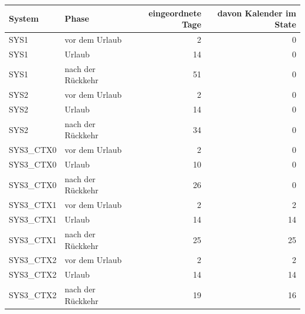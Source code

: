 \begin{tabular}{llrr}
\toprule
System & Phase & eingeordnete Tage & davon Kalender im State \\
\midrule
SYS1 & vor dem Urlaub & 2 & 0 \\
SYS1 & Urlaub & 14 & 0 \\
SYS1 & nach der Rückkehr & 51 & 0 \\
SYS2 & vor dem Urlaub & 2 & 0 \\
SYS2 & Urlaub & 14 & 0 \\
SYS2 & nach der Rückkehr & 34 & 0 \\
SYS3\_CTX0 & vor dem Urlaub & 2 & 0 \\
SYS3\_CTX0 & Urlaub & 10 & 0 \\
SYS3\_CTX0 & nach der Rückkehr & 26 & 0 \\
SYS3\_CTX1 & vor dem Urlaub & 2 & 2 \\
SYS3\_CTX1 & Urlaub & 14 & 14 \\
SYS3\_CTX1 & nach der Rückkehr & 25 & 25 \\
SYS3\_CTX2 & vor dem Urlaub & 2 & 2 \\
SYS3\_CTX2 & Urlaub & 14 & 14 \\
SYS3\_CTX2 & nach der Rückkehr & 19 & 16 \\
\bottomrule
\end{tabular}
